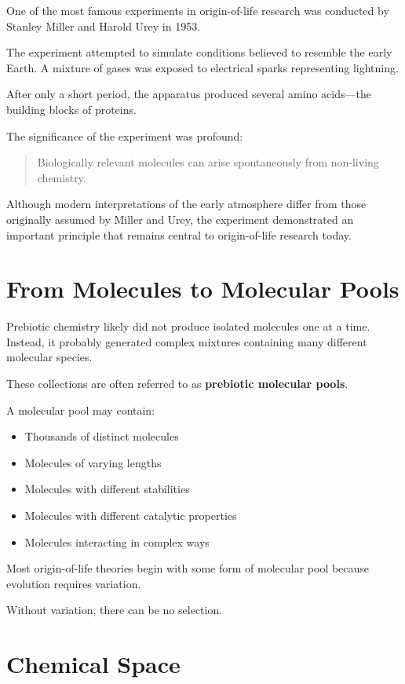 \documentclass[
  oneside,
  openany]{book}
\providecommand{\tightlist}{%
  \setlength{\itemsep}{0pt}\setlength{\parskip}{0pt}}
\begin{document}
One of the most famous experiments in origin-of-life research was conducted by Stanley Miller and Harold Urey in 1953.

The experiment attempted to simulate conditions believed to resemble the early Earth. A mixture of gases was exposed to electrical sparks representing lightning.

After only a short period, the apparatus produced several amino acids---the building blocks of proteins.

The significance of the experiment was profound:

\begin{quote}
Biologically relevant molecules can arise spontaneously from non-living chemistry.
\end{quote}

Although modern interpretations of the early atmosphere differ from those originally assumed by Miller and Urey, the experiment demonstrated an important principle that remains central to origin-of-life research today.

\section{From Molecules to Molecular Pools}\label{from-molecules-to-molecular-pools}

Prebiotic chemistry likely did not produce isolated molecules one at a time. Instead, it probably generated complex mixtures containing many different molecular species.

These collections are often referred to as \textbf{prebiotic molecular pools}.

A molecular pool may contain:

\begin{itemize}
\tightlist
\item
  Thousands of distinct molecules
\item
  Molecules of varying lengths
\item
  Molecules with different stabilities
\item
  Molecules with different catalytic properties
\item
  Molecules interacting in complex ways
\end{itemize}

Most origin-of-life theories begin with some form of molecular pool because evolution requires variation.

Without variation, there can be no selection.

\section{Chemical Space}\label{chemical-space}
\end{document}

